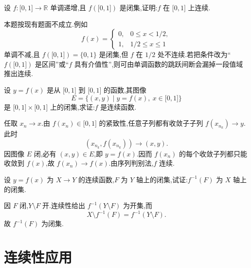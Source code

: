 \begin{example}
    设 $f:\lbrack 0,1\rbrack\to\mathbb{R}$ 单调递增,且 $f(\lbrack 0,1\rbrack)$ 是闭集,证明:$f$ 在 $\lbrack 0,1\rbrack$ 上连续.
\end{example}
\exampleblank

\begin{solution}
    本题按现有题面不成立.例如
    \[
        f(x)=
        \begin{cases}
            0, & 0\leq x<1/2,   \\
            1, & 1/2\leq x\leq1
        \end{cases}
    \]
    单调不减,且 $f(\lbrack0,1\rbrack)=\{0,1\}$ 是闭集,但 $f$ 在 $1/2$ 处不连续.若把条件改为“$f(\lbrack0,1\rbrack)$ 是区间”或“$f$ 具有介值性”,则可由单调函数的跳跃间断会漏掉一段值域推出连续.
\end{solution}

\begin{example}
    设 $y=f(x)$ 是从 $\lbrack 0,1\rbrack$ 到 $\lbrack 0,1\rbrack$ 的函数,其图像
    \[
        E=\{(x,y)\mid y=f(x),\ x\in\lbrack 0,1\rbrack\}
    \]
    是 $\lbrack 0,1\rbrack\times\lbrack 0,1\rbrack$ 上的闭集,求证:$f$ 是连续函数.
\end{example}
\exampleblank

\begin{solution}
    任取 $x_n\to x$.由 $f(x_n)\in\lbrack0,1\rbrack$ 的紧致性,任意子列都有收敛子子列 $f(x_{n_k})\to y$.此时
    \[
        (x_{n_k},f(x_{n_k}))\to(x,y).
    \]
    因图像 $E$ 闭,必有 $(x,y)\in E$,即 $y=f(x)$.因而 $f(x_n)$ 的每个收敛子列都只能收敛到 $f(x)$,故 $f(x_n)\to f(x)$.由序列判别法,$f$ 连续.
\end{solution}

\begin{example}
    设 $y=f(x)$ 为 $X\to Y$ 的连续函数,$F$ 为 $Y$ 轴上的闭集,试证:$f^{-1}(F)$ 为 $X$ 轴上的闭集.
\end{example}
\exampleblank

\begin{solution}
    因 $F$ 闭,$Y\setminus F$ 开.连续性给出 $f^{-1}(Y\setminus F)$ 为开集,而
    \[
        X\setminus f^{-1}(F)=f^{-1}(Y\setminus F).
    \]
    故 $f^{-1}(F)$ 为闭集.
\end{solution}


\newpage

\section{连续性应用}


